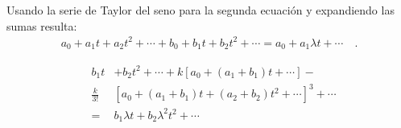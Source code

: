 \documentclass[11pt]{beamer}
\theoremstyle{definition}
\begin{document}
\begin{frame}
Usando la serie de Taylor del seno para la segunda ecuaci\'on y expandiendo las sumas resulta:
\centering
\begin{eqnarray*}
a_{0}+a_{1}t+a_{2}t^{2}+\cdots +b_{0}+b_{1}t+b_{2}t^{2}+ \cdots=a_{0}+a_{1}\lambda t+\cdots\quad .
\end{eqnarray*}

\begin{eqnarray*}
&b_{1}t&+b_{2}t^{2}+\cdots+k\left[a_{0}+(a_{1}+b_{1})t+\cdots\right]-\nonumber\\
&\frac{k}{3!}&\left[a_{0}+(a_{1}+b_{1})t+(a_{2}+b_{2})t^{2}+\cdots\right]^{3}+\cdots\nonumber\\
&=&b_{1}\lambda t+b_{2}\lambda^{2}t^{2}+\cdots
\end{eqnarray*}
\end{frame}
\end{document}

